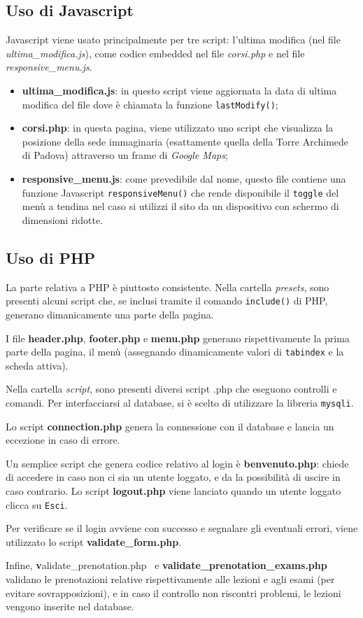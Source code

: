 \documentclass[12pt, a4paper]{article}
\begin{document}
\subsection{Uso di Javascript}
Javascript viene usato principalmente per tre script: l'ultima modifica (nel file \textit{ultima\_modifica.js}), come codice embedded nel file \textit{corsi.php} e nel file
\textit{responsive\_menu.js}.
\begin{itemize}
	\item \textbf{ultima\_modifica.js}: in questo script viene aggiornata la data di 
	ultima modifica del file dove è chiamata la funzione \texttt{lastModify()};
	\item \textbf{corsi.php}: in questa pagina, viene utilizzato uno script che visualizza 
	la posizione della sede immaginaria (esattamente quella della 
	Torre Archimede di Padova) attraverso un frame di \textit{Google Maps};
	\item \textbf{responsive\_menu.js}: come prevedibile dal nome, questo file contiene
	una funzione Javascript \texttt{responsiveMenu()} che rende disponibile il \texttt{toggle} del menù
	a tendina nel caso si utilizzi il sito da un dispositivo con schermo di dimensioni
	ridotte.
\end{itemize}

\subsection{Uso di PHP}
La parte relativa a PHP è piuttosto consistente. Nella cartella \textit{presets}, sono presenti 
alcuni script che, se inclusi tramite il comando \texttt{include()} di PHP, generano dimanicamente
una parte della pagina. \par
\smallskip
I file \textbf{header.php}, \textbf{footer.php} e \textbf{menu.php} generano rispettivamente la prima 
parte della pagina, il menù (assegnando dinamicamente valori di \texttt{tabindex} e la scheda attiva). \par
\smallskip
Nella cartella \textit{script}, sono presenti diversi script .php che eseguono controlli e comandi. Per interfacciarsi al database, si è scelto di utilizzare la libreria \texttt{mysqli}.\par
\smallskip
Lo script \textbf{connection.php} genera la connessione con il database e lancia un eccezione
in caso di errore.\par
Un semplice script che genera codice relativo al login è \textbf{benvenuto.php}: chiede di accedere
in caso non ci sia un utente loggato, e da la possibilità di uscire in caso contrario. Lo script \textbf{logout.php} viene lanciato quando un utente loggato clicca su \texttt{Esci}. \par
Per verificare se il login avviene con successo e segnalare
gli eventuali errori, viene utilizzato lo script \textbf{validate\_form.php}. \par
Infine, \mbox{\textbf validate\_prenotation.php } e 
\mbox{\textbf{validate\_prenotation\_exams.php}} 
validano le prenotazioni relative rispettivamente alle lezioni e agli esami (per 
evitare sovrapposizioni), e in caso il controllo non riscontri problemi, le lezioni vengono inserite nel database.
\end{document}
